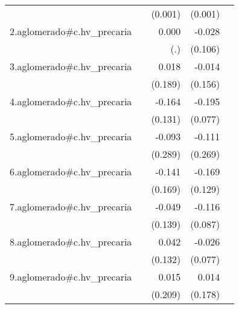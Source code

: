 {\begin{longtable}{l*{4}{D{.}{.}{-1}}}
            &                     &     (0.001)         &     (0.001)         &                     \\
\addlinespace
2.aglomerado#c.hv\_precaria&                     &       0.000         &      -0.028         &                     \\
            &                     &         (.)         &     (0.106)         &                     \\
\addlinespace
3.aglomerado#c.hv\_precaria&                     &       0.018         &      -0.014         &                     \\
            &                     &     (0.189)         &     (0.156)         &                     \\
\addlinespace
4.aglomerado#c.hv\_precaria&                     &      -0.164         &      -0.195\sym{*}  &                     \\
            &                     &     (0.131)         &     (0.077)         &                     \\
\addlinespace
5.aglomerado#c.hv\_precaria&                     &      -0.093         &      -0.111         &                     \\
            &                     &     (0.289)         &     (0.269)         &                     \\
\addlinespace
6.aglomerado#c.hv\_precaria&                     &      -0.141         &      -0.169         &                     \\
            &                     &     (0.169)         &     (0.129)         &                     \\
\addlinespace
7.aglomerado#c.hv\_precaria&                     &      -0.049         &      -0.116         &                     \\
            &                     &     (0.139)         &     (0.087)         &                     \\
\addlinespace
8.aglomerado#c.hv\_precaria&                     &       0.042         &      -0.026         &                     \\
            &                     &     (0.132)         &     (0.077)         &                     \\
\addlinespace
9.aglomerado#c.hv\_precaria&                     &       0.015         &       0.014         &                     \\
            &                     &     (0.209)         &     (0.178)         &                     \\

\end{longtable}}
